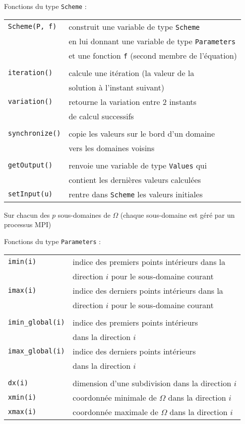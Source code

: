 \documentclass{beamer}
\begin{document}
\begin{frame}
Fonctions du type {\tt Scheme} :
\bigskip

\begin{tabular}{ll}
{\tt Scheme(P, f)} & construit une variable de type {\tt Scheme} \\
& en lui donnant une variable de type {\tt Parameters} \\
& et une fonction {\tt f} (second membre de l'équation) \\ \\
{\tt iteration()} & calcule une itération (la valeur de la \\ 
& solution à l'instant suivant)\\
{\tt variation()} & retourne la variation entre 2 instants \\ 
& de calcul successifs\\ \\
{\tt synchronize()} & copie les valeurs sur le bord d'un domaine \\
& vers les domaines voisins \\ \\
{\tt getOutput()} & renvoie une variable de type {\tt Values} qui \\ & contient les dernières valeurs calculées \\
{\tt setInput(u)} & rentre dans {\tt Scheme} les valeurs initiales \\
\end{tabular}
	
\end{frame}

\begin{frame}

Sur chacun des $p$ sous-domaines de $\Omega$ (chaque sous-domaine est géré par un processus MPI)
\bigskip

	Fonctions du type {\tt Parameters} :
	\bigskip
	
	\begin{tabular}{ll}
		{\tt imin(i)}& indice des premiers points intérieurs dans la \\ &  direction $i$ pour le sous-domaine courant \\
		{\tt imax(i)}& indice des derniers points intérieurs dans la \\ & direction $i$ pour le sous-domaine courant\\ \\
		{\tt imin\_global(i)}& indice des premiers points intérieurs \\ &  dans la direction $i$ \\
		{\tt imax\_global(i)}& indice des derniers points intérieurs \\ & dans la direction $i$ \\ \\
		{\tt dx(i)} & dimension d'une subdivision dans la direction $i$\\
		{\tt xmin(i)} & coordonnée minimale de $\Omega$ dans la direction $i$ \\
		{\tt xmax(i)} & coordonnée maximale de $\Omega$ dans la direction $i$ \\
	\end{tabular}
	
\end{frame}
\end{document}
